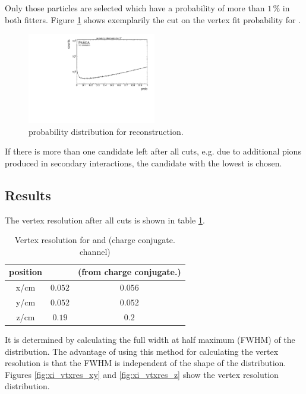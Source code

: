 		Only those particles are selected which have a probability of more than $1\,\%$ in both fitters. 
		Figure \ref{fig:XiPlus_prob} shows exemplarily the cut on the vertex fit probability for \anticascade.
		
		\begin{figure}
			\centering
				\includegraphics[width=0.50\textwidth]{./plots/Xi/XiPlus_prob.pdf}
			\caption{\propose probability distribution for \anticascade reconstruction.}
			\label{fig:XiPlus_prob}
		\end{figure}
			
		If there is more than one candidate left after all cuts, e.g. due to additional pions produced in secondary interactions, the candidate with the 
		lowest \chisq is chosen.
		
		
	\subsection*{Results}
		The vertex resolution after all cuts is shown in table \ref{tab:XiPlus_vtxres}. 
		
		\begin{table}
			\centering
			\caption{\propose Vertex resolution for \anticascade and \cascade (charge conjugate. channel)}
			\label{tab:XiPlus_vtxres}
			\begin{tabular}{ccc}
				\hline
				position & \anticascade & \cascade(from charge conjugate.) \\\hline
				\hline
				x/cm & $0.052$ & $0.056$\\
				y/cm & $0.052$ & $0.052$\\
				z/cm & $0.19$ & $0.2$\\
				\hline
				    
			\end{tabular}
		\end{table}
		
		It is determined by calculating the full width at half maximum (FWHM) of the distribution.
		The advantage of using this method for calculating the vertex resolution is that the FWHM is independent of the shape of the distribution.
		Figures \ref{fig:xi_vtxres_xy} and \ref{fig:xi_vtxres_z} show the vertex resolution distribution. 
		

